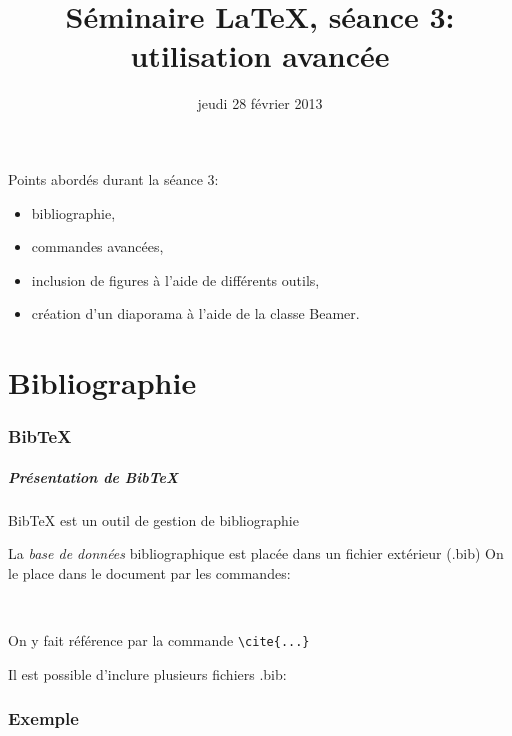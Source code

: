 \documentclass{beamer}
\title [Séminaire \LaTeX, séance 3]{Séminaire \LaTeX, séance 3: utilisation avancée}
\date{jeudi 28 février 2013}
\begin{document}

\begin{frame}
    \titlepage
\end{frame}


\begin{frame}{Points abordés durant la séance 3:}
    \begin{itemize}
            \item bibliographie, 
            \item commandes avancées, 
            \item inclusion de figures à l'aide de différents outils, 
            \item création d'un diaporama à l'aide de la classe Beamer. 
        \end{itemize}
\end{frame}


\part{Bibliographie}


\section{BibTeX}


\begin{frame}[fragile]
\frametitle{Présentation de BibTeX}
BibTeX est un outil de gestion de bibliographie
	

La \emph{base de données} bibliographique est placée dans un fichier extérieur (.bib)
On le place dans le document par les commandes:
\begin{lstlisting}


\end{lstlisting}
On y fait référence par la commande \lstinline?\cite{...}?  \cite{latexcompanion}

Il est possible d'inclure plusieurs fichiers .bib:
\lstinline??
\end{frame}


\section{Exemple}
\end{document}

